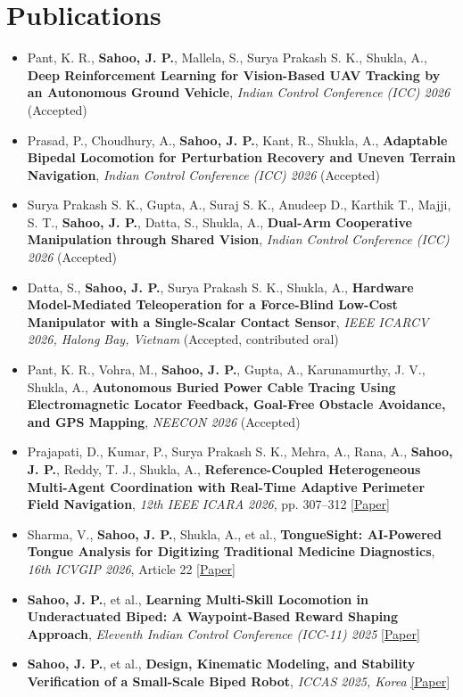 \documentclass[letterpaper,10pt]{article}
\newcommand{\me}{\textbf{Sahoo, J. P.}}
\newenvironment{bullets}{\begin{itemize}[label=\textbullet]\small}{\end{itemize}\vspace{-2pt}}
\begin{document}
\section{Publications}
\begin{bullets}
  \item Pant, K. R., \me, Mallela, S., Surya Prakash S. K., Shukla, A., \textbf{Deep Reinforcement Learning for Vision-Based UAV Tracking by an Autonomous Ground Vehicle}, \textit{Indian Control Conference (ICC) 2026} (Accepted)
  \item Prasad, P., Choudhury, A., \me, Kant, R., Shukla, A., \textbf{Adaptable Bipedal Locomotion for Perturbation Recovery and Uneven Terrain Navigation}, \textit{Indian Control Conference (ICC) 2026} (Accepted)
  \item Surya Prakash S. K., Gupta, A., Suraj S. K., Anudeep D., Karthik T., Majji, S. T., \me, Datta, S., Shukla, A., \textbf{Dual-Arm Cooperative Manipulation through Shared Vision}, \textit{Indian Control Conference (ICC) 2026} (Accepted)
  \item Datta, S., \me, Surya Prakash S. K., Shukla, A., \textbf{Hardware Model-Mediated Teleoperation for a Force-Blind Low-Cost Manipulator with a Single-Scalar Contact Sensor}, \textit{IEEE ICARCV 2026, Halong Bay, Vietnam} (Accepted, contributed oral)
  \item Pant, K. R., Vohra, M., \me, Gupta, A., Karunamurthy, J. V., Shukla, A., \textbf{Autonomous Buried Power Cable Tracing Using Electromagnetic Locator Feedback, Goal-Free Obstacle Avoidance, and GPS Mapping}, \textit{NEECON 2026} (Accepted)
  \item Prajapati, D., Kumar, P., Surya Prakash S. K., Mehra, A., Rana, A., \me, Reddy, T. J., Shukla, A., \textbf{Reference-Coupled Heterogeneous Multi-Agent Coordination with Real-Time Adaptive Perimeter Field Navigation}, \textit{12th IEEE ICARA 2026}, pp. 307--312 \href{https://doi.org/10.1109/icara69401.2026.11480352}{[Paper]}
  \item Sharma, V., \me, Shukla, A., et al., \textbf{TongueSight: AI-Powered Tongue Analysis for Digitizing Traditional Medicine Diagnostics}, \textit{16th ICVGIP 2026}, Article 22 \href{https://doi.org/10.1145/3774521.3774545}{[Paper]}
  \item \me, et al., \textbf{Learning Multi-Skill Locomotion in Underactuated Biped: A Waypoint-Based Reward Shaping Approach}, \textit{Eleventh Indian Control Conference (ICC-11) 2025} \href{https://doi.org/10.1109/icc69100.2025.11372287}{[Paper]}
  \item \me, et al., \textbf{Design, Kinematic Modeling, and Stability Verification of a Small-Scale Biped Robot}, \textit{ICCAS 2025, Korea} \href{https://doi.org/10.23919/iccas66577.2025.11301351}{[Paper]}

\end{bullets}
\end{document}
